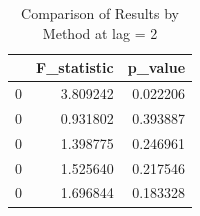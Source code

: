 \begin{table}
\caption{Comparison of Results by Method at lag = 2}
\label{tab:results_by_method}
\begin{tabular}{lrr}
\toprule
 & F\_statistic & p\_value \\
\midrule
0 & 3.809242 & 0.022206 \\
0 & 0.931802 & 0.393887 \\
0 & 1.398775 & 0.246961 \\
0 & 1.525640 & 0.217546 \\
0 & 1.696844 & 0.183328 \\
\bottomrule
\end{tabular}
\end{table}
